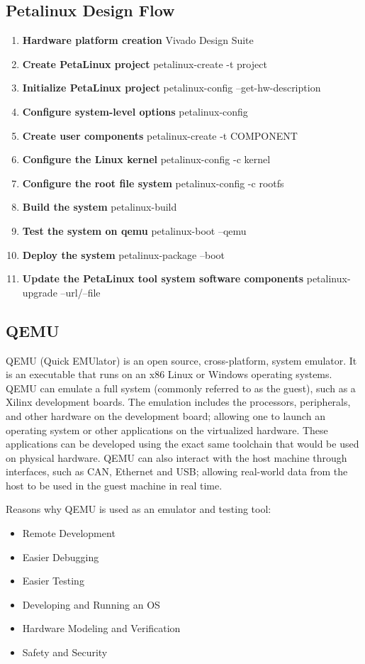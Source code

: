 \subsection{Petalinux Design Flow}
\begin{enumerate}
  \item \textbf{Hardware platform creation} Vivado Design Suite
  \item \textbf{Create PetaLinux project} petalinux-create -t project
  \item \textbf{Initialize PetaLinux project} petalinux-config --get-hw-description
  \item \textbf{Configure system-level options} petalinux-config
  \item \textbf{Create user components} petalinux-create -t COMPONENT
  \item \textbf{Configure the Linux kernel} petalinux-config -c kernel
  \item \textbf{Configure the root file system} petalinux-config -c rootfs
  \item \textbf{Build the system} petalinux-build
  \item \textbf{Test the system on qemu} petalinux-boot --qemu
  \item \textbf{Deploy the system} petalinux-package --boot
  \item \textbf{Update the PetaLinux tool system software components} petalinux-upgrade --url/--file
\end{enumerate}

\clearpage
\subsection{QEMU} 
QEMU (Quick EMUlator) is an open source, cross-platform, system emulator. It is an executable that runs on an x86 Linux or Windows operating systems. QEMU can emulate a full system (commonly referred to as the guest), such as a Xilinx development boards. The emulation includes the processors, peripherals, and other hardware on the development board; allowing one to launch an operating system or other applications on the virtualized hardware. These applications can be developed using the exact same toolchain that would be used on physical hardware. QEMU can also interact with the host machine through interfaces, such as CAN, Ethernet and USB; allowing real-world data from the host to be used in the guest machine in real time.

\par Reasons why QEMU is used as an emulator and testing tool:
\begin{itemize}
  \item Remote Development
  \item Easier Debugging
  \item Easier Testing
  \item Developing and Running an OS
  \item Hardware Modeling and Verification
  \item Safety and Security
\end{itemize}

